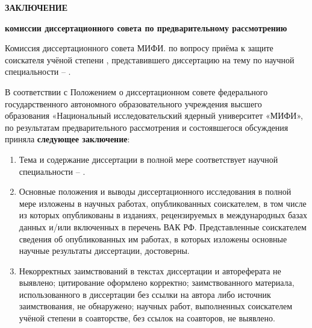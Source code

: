     \begin{tightcenter}
        \textbf{ЗАКЛЮЧЕНИЕ}
        
        \textbf{комиссии диссертационного совета по предварительному рассмотрению}
    \end{tightcenter}

    \vspace{5mm}
    
    Комиссия диссертационного совета МИФИ. по вопросу приёма к защите соискателя учёной степени  , представившего диссертацию на тему  по научной специальности  – .

    В соответствии с Положением о диссертационном совете федерального государственного автономного образовательного учреждения высшего образования «Национальный исследовательский ядерный университет «МИФИ», по результатам предварительного рассмотрения и состоявшегося обсуждения приняла \textbf{следующее заключение}:

    \begin{enumerate}
        \item Тема и содержание диссертации в полной мере соответствует научной специальности  – .

        \item Основные положения и выводы диссертационного исследования в полной мере изложены в  научных работах, опубликованных соискателем, в том числе  из которых опубликованы в изданиях, рецензируемых в международных базах данных и/или включенных в перечень ВАК РФ. Представленные соискателем сведения об опубликованных им работах, в которых изложены основные научные результаты диссертации, достоверны.

        \item Некорректных заимствований в текстах диссертации и автореферата не выявлено; цитирование оформлено корректно; заимствованного материала, использованного в диссертации без ссылки на автора либо источник заимствования, не обнаружено; научных работ, выполненных соискателем учёной степени в соавторстве, без ссылок на соавторов, не выявлено.

    \end{enumerate}

